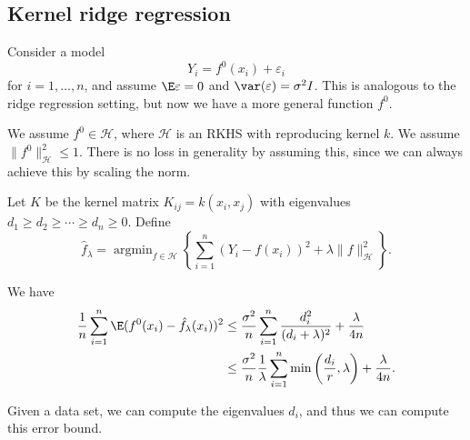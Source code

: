 \documentclass[a4paper]{article}
\DeclareMathOperator*\argmin{argmin}
\begin{document}
\subsection{Kernel ridge regression}
Consider a model
\[
  Y_i = f^0(x_i) + \varepsilon_i
\]
for $i = 1, \ldots, n$, and assume $\E \varepsilon = 0$ and $\var(\varepsilon) = \sigma^2 I$. This is analogous to the ridge regression setting, but now we have a more general function $f^0$.

We assume $f^0 \in \mathcal{H}$, where $\mathcal{H}$ is an RKHS with reproducing kernel $k$. We assume $\|f^0\|^2_{\mathcal{H}} \leq 1$. There is no loss in generality by assuming this, since we can always achieve this by scaling the norm.

Let $K$ be the kernel matrix $K_{ij} = k(x_i, x_j)$ with eigenvalues $d_1 \geq d_2 \geq \cdots \geq d_n \geq 0$. Define
\[
  \hat{f}_\lambda = \argmin_{f \in \mathcal{H}} \left\{ \sum_{i = 1}^n (Y_i - f(x_i))^2 + \lambda \|f\|_\mathcal{H}^2\right\}.
\]
\begin{thm}
  We have
  \begin{align*}
    \frac{1}{n} \sum_{i = 1}^n \E(f^0(x_i) - \hat{f}_\lambda (x_i))^2 &\leq \frac{\sigma^2}{n} \sum_{i = 1}^n \frac{d_i^2}{(d_i + \lambda)^2} + \frac{\lambda}{4n}\\
    &\leq \frac{\sigma^2}{n} \frac{1}{\lambda} \sum_{i = 1}^n \min \left(\frac{d_i}{r}, \lambda\right) + \frac{\lambda}{4n}.
  \end{align*}
\end{thm}
Given a data set, we can compute the eigenvalues $d_i$, and thus we can compute this error bound.
\end{document}
